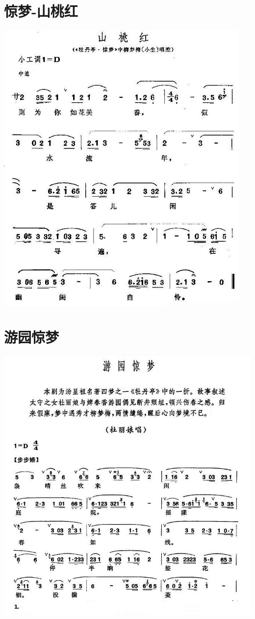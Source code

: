 \documentclass[cn,pad,twocol]{elegantbook}
\begin{document}
\section{惊梦-山桃红}\includegraphics[width=0.95\textwidth]{mudanting/2021-牡丹亭-惊梦-山桃红.jpg}
\section{游园惊梦}
\paragraph*{\includegraphics[width=\textwidth]{mudanting/2020-牡丹亭-游园惊梦1}} 
\end{document}

